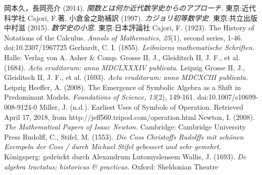 \documentclass[./main]{subfile}
\begin{document}
\begin{thebibliography}{99}
岡本久，長岡亮介 (2014). {\it 関数とは何か\quad 近代数学史からのアプローチ.} 東京:近代科学社
Cajori, F.著, 小倉金之助補訳 (1997). {\it カジョリ初等数学史.} 東京:共立出版
中村滋 (2015). {\it 数学史の小窓.} 東京:日本評論社
Cajori, F. (1923). The History of Notations of the Calculus. {\it Annals of Mathematics, 25}(1), second series, 1-46. doi:10.2307/1967725
Gerhardt, C. I. (1855). {\it Leibnizens mathematische Schriften.} Halle: Verlag von A. Asher \& Comp.
Grosse II, J., Gleiditsch II, J. F., et al. (1684). {\it Acta eruditorum: anno MDCLXXXIV publicata.} Leipzig
Grosse II, J., Gleiditsch II, J. F., et al. (1693). {\it Acta eruditorum: anno MDCXCIII publicata.} Leipzig
Heeffer, A. (2008). The Emergence of Symbolic Algebra as a Shift in Predominant Models. {\it Foundations of Science, 13}(2), 149-161. doi:10.1007/s10699-008-9124-0 
Miller, J. (n.d.). Earliest Uses of Symbols of Operation. Retrieved April 17, 2018, from http://jeff560.tripod.com/operation.html 
Newton, I. (2008). {\it The Mathematical Papers of Isaac Newton.} Cambridge: Cambridge University Press
Rudolff, C., Stifel, M. (1553). {\it Die Coss Christoffs Rudolffs mit schönen Exempeln der Coss / durch Michael Stifel gebessert und sehr gemehrt.} K\"onigsperg: gedr\"uckt durch Alexandrum Lutomyslensem
Wallis, J. (1693). {\it De algebra tractatus; historicus \& practicus.} Oxford: Sheldonian Theatre
\end{thebibliography}
\end{document}
